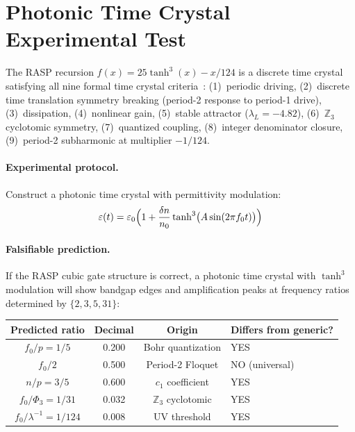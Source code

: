\documentclass[12pt,a4paper]{article}
\theoremstyle{definition}
\newcommand{\Phithree}{\Phi_3}
\begin{document}
\appendix
\section{Photonic Time Crystal Experimental Test}

The RASP recursion $f(x) = 25\tanh^3(x) - x/124$ is a discrete time
crystal satisfying all nine formal time crystal criteria~\cite{sacha2018,yao2017}:
(1)~periodic driving, (2)~discrete time translation symmetry breaking
(period-2 response to period-1 drive), (3)~dissipation, (4)~nonlinear gain,
(5)~stable attractor ($\lambda_L = -4.82$), (6)~$\mathbb{Z}_3$ cyclotomic
symmetry, (7)~quantized coupling, (8)~integer denominator closure,
(9)~period-2 subharmonic at multiplier $-1/124$.

\paragraph{Experimental protocol.}
Construct a photonic time crystal with permittivity modulation:
\[
  \varepsilon(t) = \varepsilon_0
    \Bigl(1 + \frac{\delta n}{n_0}\tanh^3\bigl(A\sin(2\pi f_0 t)\bigr)\Bigr)
\]

\paragraph{Falsifiable prediction.}
If the RASP cubic gate structure is correct, a photonic time crystal with
$\tanh^3$ modulation will show bandgap edges and amplification peaks at
frequency ratios determined by $\{2, 3, 5, 31\}$:

\begin{center}
\begin{tabular}{cccl}
\toprule
Predicted ratio & Decimal & Origin & Differs from generic? \\
\midrule
$f_0/p = 1/5$        & 0.200  & Bohr quantization   & YES \\
$f_0/2$              & 0.500  & Period-2 Floquet     & NO (universal) \\
$n/p = 3/5$          & 0.600  & $c_1$ coefficient    & YES \\
$f_0/\Phithree = 1/31$ & 0.032 & $\mathbb{Z}_3$ cyclotomic & YES \\
$f_0/\lambda^{-1} = 1/124$ & 0.008 & UV threshold  & YES \\
\bottomrule
\end{tabular}
\end{center}
\end{document}
